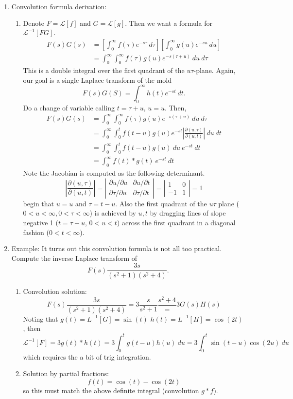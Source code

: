 \documentclass{article}
\begin{document}
\begin{enumerate}
\item Convolution formula derivation:
\begin{enumerate}
\item Denote $F=\mathcal{L}[f]$ and $G=\mathcal{L}[g]$. Then we want a formula for $\mathcal{L}^{-1}[FG]$.
\begin{align*}
F(s) G(s) 
&= \left[\int_0^{\infty} f(\tau) e^{-s\tau}~d\tau\right] \left[\int_0^{\infty} g(u)e^{-su} ~du\right] \\
&= \int_0^{\infty}\int_0^{\infty} f(\tau)g(u) e^{-s(\tau+u)}~du~d\tau 
\end{align*}
This is a double integral over the first quadrant of the $u \tau$-plane.
Again, our goal is a single Laplace transform of the mold
\[
F(s)G(S) = \int_0^{\infty} h(t)e^{-st}~dt.
\]
Do a change of variable calling $t=\tau+u$, $u=u$. Then, 
\begin{align*}
F(s) G(s) 
&= \int_0^{\infty}\int_0^{\infty} f(\tau)g(u) e^{-s(\tau+u)}~du~d\tau \\
&= \int_0^{\infty}\int_0^{t} f(t-u)g(u) e^{-st} \left| \frac{\partial(u,\tau)}{\partial(u,t)} \right|~du~dt  \\
&= \int_0^{\infty}\int_0^{t} f(t-u)g(u)  ~du ~e^{-st}~dt \\
&= \int_0^{\infty} f(t)\ast g(t) ~e^{-st}~dt
\end{align*}
Note the Jacobian is computed as the following determinant.
\[
\left| \frac{\partial(u,\tau)}{\partial(u,t)} \right| = \left|
\begin{array}{cc}
\partial u/\partial u & \partial u / \partial t \\
\partial \tau/\partial u & \partial \tau / \partial t 
\end{array} \right|
 = \left|
\begin{array}{cc}
1 & 0 \\
-1 & 1 
\end{array} \right| = 1
\]
begin that $u=u$ and $\tau = t-u$. Also the first quadrant of the $u \tau$ plane ($0<u<\infty, 0<\tau <\infty$) is achieved by $u,t$ by dragging lines of slope negative 1 ($t=\tau+u$, $0<u<t$) across the first quadrant in a diagonal fashion ($0<t<\infty$).
\end{enumerate}

\item Example: It turns out this convolution formula is not all too practical. Compute the inverse Laplace transform of
\[
F(s) \frac{3s}{(s^2+1)(s^2+4)}.
\]
\begin{enumerate}
\item Convolution solution:
\[
F(s) \frac{3s}{(s^2+1)(s^2+4)} = 3 \frac{s}{s^2+1}\frac{s^2+4} = 3G(s)H(s)
\]
Noting that $g(t)={L}^{-1}[G]=\sin(t)$ $h(t)={L}^{-1}[H]=\cos(2t)$, then
\[
\mathcal{L}^{-1}[F] = 3 g(t) \ast h(t) = 3\int_0^t g(t-u)h(u)~du = 3\int_0^t \sin(t-u)\cos(2u)~du
\]
which requires the a bit of trig integration. 
\item Solution by partial fractions:
\[
f(t) = \cos(t)-\cos(2t)
\]
so this must match the above definite integral (convolution $g \ast f$).
\end{enumerate}


\end{enumerate}
\end{document}
